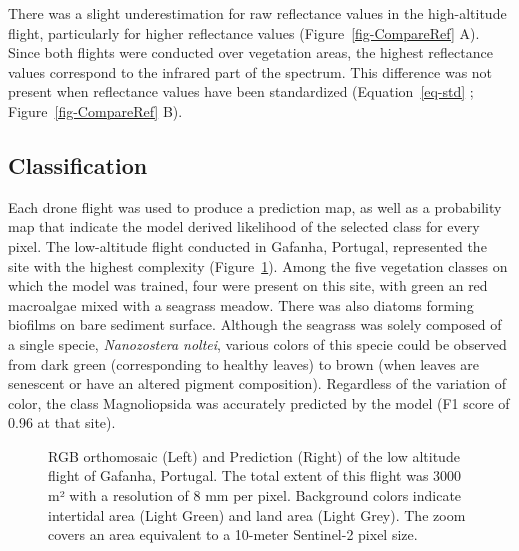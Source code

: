 \documentclass[
  number]{elsarticle}
\begin{document}
There was a slight underestimation for raw reflectance values in the
high-altitude flight, particularly for higher reflectance values
(Figure~\ref{fig-CompareRef} A). Since both flights were conducted over
vegetation areas, the highest reflectance values correspond to the
infrared part of the spectrum. This difference was not present when
reflectance values have been standardized (Equation~\ref{eq-std} ;
Figure~\ref{fig-CompareRef} B).

\subsection{Classification}\label{classification}

Each drone flight was used to produce a prediction map, as well as a
probability map that indicate the model derived likelihood of the
selected class for every pixel. The low-altitude flight conducted in
Gafanha, Portugal, represented the site with the highest complexity
(Figure~\ref{fig-GafLow}). Among the five vegetation classes on which
the model was trained, four were present on this site, with green an red
macroalgae mixed with a seagrass meadow. There was also diatoms forming
biofilms on bare sediment surface. Although the seagrass was solely
composed of a single specie, \emph{Nanozostera noltei}, various colors
of this specie could be observed from dark green (corresponding to
healthy leaves) to brown (when leaves are senescent or have an altered
pigment composition). Regardless of the variation of color, the class
Magnoliopsida was accurately predicted by the model (F1 score of 0.96 at
that site).

\label{cell-fig-GafLow}
\begin{figure}[H]


\caption{\label{fig-GafLow}RGB orthomosaic (Left) and Prediction (Right)
of the low altitude flight of Gafanha, Portugal. The total extent of
this flight was 3000 m² with a resolution of 8 mm per pixel. Background
colors indicate intertidal area (Light Green) and land area (Light
Grey). The zoom covers an area equivalent to a 10-meter Sentinel-2 pixel
size.}

\end{figure}%
\end{document}
